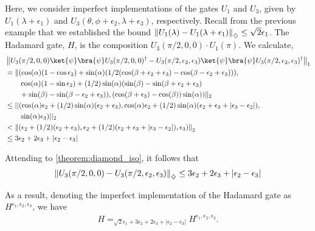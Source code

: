 \begin{example}
    Here, we consider imperfect implementations of the gates $U_1$ and $U_3$, given by $ U_1(\lambda + \epsilon_1) $ and $ U_3(\theta, \phi + \epsilon_2, \lambda + \epsilon_3)$, respectively. 
    Recall from the previous example that we established the bound $\left\lVert U_1(\lambda)- U_1(\lambda + \epsilon_1)  \right\rVert_{\diamondsuit} \leq \sqrt{2} \epsilon_1$.
     The Hadamard gate, $H$, is the composition $U_3(\pi/2, 0, 0)\cdot U_1(\pi)$. We calculate,
    \begin{align*}
      &\tracenorm{U_3(\pi/2, 0, 0) \ket{\psi}\bra{\psi}U_3(\pi/2, 0, 0)^\dag - U_3(\pi/2, \epsilon_2, \epsilon_3)  \ket{\psi}\bra{\psi}U_3(\pi/2, \epsilon_2, \epsilon_3)^\dag} \\
      & = \lVert (\cos(\alpha)( 1-\cos{\epsilon_2}) + \sin(\alpha)( 1/2(\cos(\beta + \epsilon_2 + \epsilon_3)-\cos(\beta - \epsilon_2 + \epsilon_3))), \\
      & \hspace{20pt} \cos(\alpha)( 1-\sin{\epsilon_2}) + (1/2)\sin(\alpha) (\sin(\beta)-\sin(\beta+\epsilon_2 + \epsilon_3)   \\
      & \hspace{20pt} + \sin(\beta)-\sin(\beta-\epsilon_2 + \epsilon_3)),  (\cos(\beta + \epsilon_3)-\cos(\beta))\sin(\alpha) ) \lVert_2 \\
      & \leq ||(\cos(\alpha) \epsilon_2 + (1/2)\sin(\alpha) (\epsilon_2 + \epsilon_3) ,\cos(\alpha) \epsilon_2 + (1/2)  \sin(\alpha) (\epsilon_2 + \epsilon_3 + |\epsilon_3-\epsilon_2|), \\
      & \hspace{20pt} \sin(\alpha) \epsilon_3)||_2 \\
      &  < \euclideannorm{(\epsilon_2 + (1/2)(\epsilon_2 + \epsilon_3), \epsilon_2 + (1/2)   (\epsilon_2 + \epsilon_3 + |\epsilon_3-\epsilon_2|), \epsilon_3)}  \\
      & \leq 3 \epsilon_2 +  2\epsilon_3 + |\epsilon_2-\epsilon_3| \\
    \end{align*}

    Attending to \autoref{theorem:diamond_iso}, it follows that
    \begin{align*}
      \left\lVert U_3(\pi/2, 0, 0)- U_3(\pi/2, \epsilon_2, \epsilon_3)  \right\rVert_{\diamondsuit} \leq 3 \epsilon_2 +  2\epsilon_3 + |\epsilon_2-\epsilon_3|
    \end{align*}

    
    As a result, denoting the imperfect implementation of the Hadamard gate as $H^{\epsilon_1 ,\epsilon_2, \epsilon_3}$, we have 
    \begin{align} \label{eq:h_error_telepor}
      H =_{ \sqrt{2}\epsilon_1 + 3 \epsilon_2 + 2\epsilon_3 + |\epsilon_2-\epsilon_3|} H^{\epsilon_1 ,\epsilon_2, \epsilon_3}.
    \end{align}
 


\end{example}
